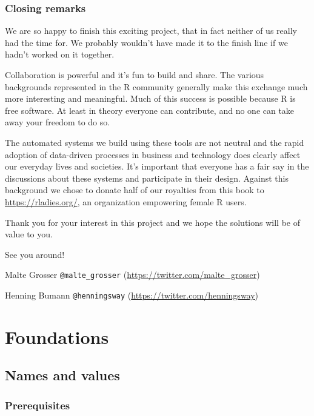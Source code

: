 \documentclass[
]{krantz}
\renewcommand{\href}[2]{#2 (\url{#1})}
\begin{document}
\hypertarget{closing-remarks}{%
\section{Closing remarks}\label{closing-remarks}}

We are so happy to finish this exciting project, that in fact neither of us really had the time for. We probably wouldn't have made it to the finish line if we hadn't worked on it together.

Collaboration is powerful and it's fun to build and share. The various backgrounds represented in the R community generally make this exchange much more interesting and meaningful. Much of this success is possible because R is free software. At least in theory everyone can contribute, and no one can take away your freedom to do so.

The automated systems we build using these tools are not neutral and the rapid adoption of data-driven processes in business and technology does clearly affect our everyday lives and societies. It's important that everyone has a fair say in the discussions about these systems and participate in their design. Against this background we chose to donate half of our royalties from this book to \url{https://rladies.org/}, an organization empowering female R users.

Thank you for your interest in this project and we hope the solutions will be of value to you.

See you around!

Malte Grosser \href{https://twitter.com/malte_grosser}{\texttt{@malte\_grosser}}

Henning Bumann \href{https://twitter.com/henningsway}{\texttt{@henningsway}}

\hypertarget{part-foundations}{%
\part{Foundations}\label{part-foundations}}

\hypertarget{names-and-values}{%
\chapter{Names and values}\label{names-and-values}}

\hypertarget{prerequisites}{%
\section*{Prerequisites}\label{prerequisites}}
\end{document}
